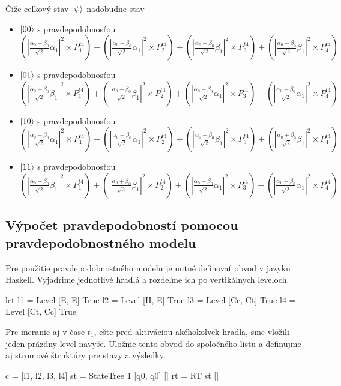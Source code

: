 Čiže celkový stav \(\ket{\psi}\) nadobudne stav
    \begin{itemize}
        \item[] \(\ket{00}\) s pravdepodobnosťou \\
\((|\frac{\alpha_0 + \beta_0}{\sqrt{2}}\alpha_1|^2 \times P^{t4}_1) + (|\frac{\alpha_0 - \beta_0}{\sqrt{2}}\alpha_1|^2 \times P^{t4}_2) + (|\frac{\alpha_0 + \beta_0}{\sqrt{2}}\beta_1|^2 \times P^{t4}_3) + (|\frac{\alpha_0 - \beta_0}{\sqrt{2}}\beta_1|^2 \times P^{t4}_4)\)

        \item[] \(\ket{01}\) s pravdepodobnosťou \\
 \((|\frac{\alpha_0 + \beta_0}{\sqrt{2}}\beta_1|^2 \times P^{t4}_1) + (|\frac{\alpha_0 - \beta_0}{\sqrt{2}}\beta_1|^2 \times P^{t4}_2) + (|\frac{\alpha_0 + \beta_0}{\sqrt{2}}\alpha_1|^2 \times P^{t4}_3) + (|\frac{\alpha_0 - \beta_0}{\sqrt{2}}\alpha_1|^2 \times P^{t4}_4)\)

        \item[] \(\ket{10}\) s pravdepodobnosťou \\ 
\((|\frac{\alpha_0 - \beta_0}{\sqrt{2}}\alpha_1|^2 \times P^{t4}_1) + (|\frac{\alpha_0 + \beta_0}{\sqrt{2}}\alpha_1|^2 \times P^{t4}_2) + (|\frac{\alpha_0 - \beta_0}{\sqrt{2}}\beta_1|^2 \times P^{t4}_3) + (|\frac{\alpha_0 + \beta_0}{\sqrt{2}}\beta_1|^2 \times P^{t4}_4)\)

        \item[] \(\ket{11}\) s pravdepodobnosťou \\
\((|\frac{\alpha_0 - \beta_0}{\sqrt{2}}\beta_1|^2 \times P^{t4}_1) + (|\frac{\alpha_0 + \beta_0}{\sqrt{2}}\beta_1|^2 \times P^{t4}_2) + (|\frac{\alpha_0 - \beta_0}{\sqrt{2}}\alpha_1|^2 \times P^{t4}_3) + (|\frac{\alpha_0 + \beta_0}{\sqrt{2}}\alpha_1|^2 \times P^{t4}_4)\)
    \end{itemize}

\subsection*{Výpočet pravdepodobností pomocou pravdepodobnostného modelu}
Pre použitie pravdepodobnostného modelu je nutné definovať obvod v jazyku 
Haskell. Vyjadrime jednotlivé hradlá a rozdeľme ich po vertikálnych leveloch.
\begin{code}
let l1 = Level [E, E] True
    l2 = Level [H, E] True
    l3 = Level [Cc, Ct] True
    l4 = Level [Ct, Cc] True
\end{code}
Pre meranie aj v čase \(t_1\), ešte pred aktiváciou akéhokoľvek hradla,  
sme vložili jeden prázdny level navyše. Uložme tento obvod do spoločného listu
a definujme aj stromové štruktúry pre stavy a výsledky.
\begin{code}
c = [l1, l2, l3, l4]
st = StateTree 1 [q0, q0] []
rt = RT st []
\end{code}

